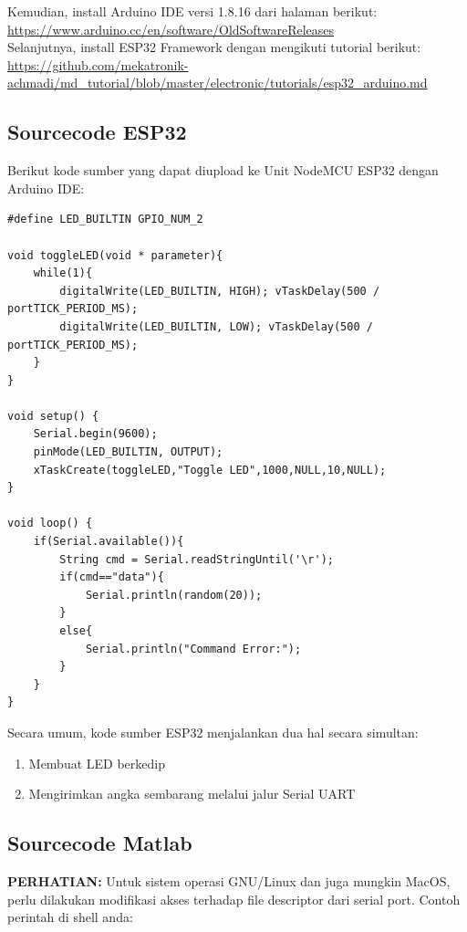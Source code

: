 \documentclass[12pt]{book}
\begin{document}
	Kemudian, install Arduino IDE versi 1.8.16 dari halaman berikut:\\
	\url{https://www.arduino.cc/en/software/OldSoftwareReleases}\\
	
	Selanjutnya, install ESP32 Framework dengan mengikuti tutorial berikut:\\
	\url{https://github.com/mekatronik-achmadi/md_tutorial/blob/master/electronic/tutorials/esp32_arduino.md}
	
	\subsection{Sourcecode ESP32}
	
	Berikut kode sumber yang dapat diupload ke Unit NodeMCU ESP32 dengan Arduino IDE:

	\begin{verbatim}
#define LED_BUILTIN GPIO_NUM_2

void toggleLED(void * parameter){
	while(1){
		digitalWrite(LED_BUILTIN, HIGH); vTaskDelay(500 / portTICK_PERIOD_MS);
		digitalWrite(LED_BUILTIN, LOW); vTaskDelay(500 / portTICK_PERIOD_MS);
	}
}

void setup() {
	Serial.begin(9600);
	pinMode(LED_BUILTIN, OUTPUT);
	xTaskCreate(toggleLED,"Toggle LED",1000,NULL,10,NULL);
}

void loop() {
	if(Serial.available()){
		String cmd = Serial.readStringUntil('\r');
		if(cmd=="data"){
			Serial.println(random(20));
		}
		else{
			Serial.println("Command Error:");
		}
	}
}
	\end{verbatim}

	Secara umum, kode sumber ESP32 menjalankan dua hal secara simultan:
	\begin{enumerate}
		\item Membuat LED berkedip
		\item Mengirimkan angka sembarang melalui jalur Serial UART
	\end{enumerate}

	\subsection{Sourcecode Matlab}
	
	\textbf{PERHATIAN:} Untuk sistem operasi GNU/Linux dan juga mungkin MacOS,
	perlu dilakukan modifikasi akses terhadap file descriptor dari serial port.
	Contoh perintah di shell anda:
\end{document}
